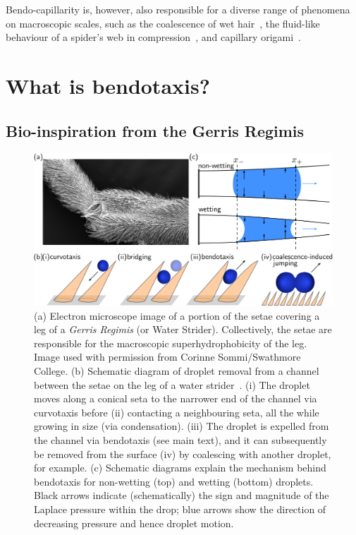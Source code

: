 Bendo-capillarity is, however, also responsible for a diverse range of phenomena on macroscopic scales, such as the coalescence of wet hair~\citep{Bico2004Nature, Duprat2012Nature}, the fluid-like behaviour of a spider's web in compression~\citep{Elettro2016PNAS}, and capillary origami~\citep{Py2007PRL}.





\section{What is bendotaxis?}
  \subsection{Bio-inspiration from the Gerris Regimis}
  \begin{figure}[t]
\includegraphics[width = \textwidth]{wang_schematic}
\caption{(a) Electron microscope image of a portion of the setae covering a leg of a \textit{Gerris Regimis} (or Water Strider). Collectively, the setae are responsible for the macroscopic superhydrophobicity of the leg. Image used with permission from Corinne Sommi/Swathmore College. (b) Schematic diagram of droplet removal from a channel between the setae on the leg of a water strider~\citep[after][]{Wang2015PNAS}. (i) The droplet moves along a conical seta to the narrower end of the channel via curvotaxis before (ii) contacting a neighbouring seta, all the while growing in size (via condensation). (iii) The droplet is expelled from the channel via bendotaxis (see main text), and it can subsequently be removed from the surface (iv) by coalescing with another droplet, for example. (c) Schematic diagrams explain the mechanism behind bendotaxis for non-wetting (top) and wetting (bottom) droplets. Black arrows indicate (schematically) the sign and magnitude of the Laplace pressure within the drop; blue arrows show the direction of decreasing pressure and hence droplet motion.}\label{fig:Ch1:StriderMechanism}
\end{figure}


